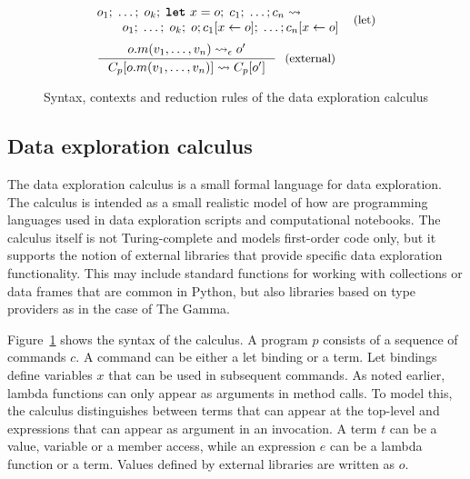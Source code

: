 \documentclass[fleqn,11pt]{report}
\newcommand{\kvd}[1]{\textnormal{\ttfamily\bfseries #1}}
\theoremstyle{definition}
\begin{document}
\begin{figure}
%
\hspace{0.5em}{\sffamily Let elimination and member reduction}
%
\begin{equation*}
\begin{array}{l}
\hspace{-0.5em}\begin{array}{l}
o_1;\; \ldots;\; o_{k};\; \kvd{let}~x=o;\; c_{1};\; \ldots; c_n \rightsquigarrow\\
\qquad  o_1;\; \ldots;\; o_{k};\; o; c_{1}[x\leftarrow o];\; \ldots; c_n[x\leftarrow o]\end{array}
~~\text{\small (let)}\\[1.2em]
\inference
  {o.m(v_1, \ldots, v_n) \rightsquigarrow_\epsilon o'}
  {C_p[o.m(v_1, \ldots, v_n)] \rightsquigarrow C_p[o']}
~~\text{\small (external)}
\end{array}
\end{equation*}

\caption{Syntax, contexts and reduction rules of the data exploration calculus}
\label{fig:dec-calculus}
\end{figure}

\subsection{Data exploration calculus}

The data exploration calculus is a small formal language for data exploration. The calculus is
intended as a small realistic model of how are programming languages used in data exploration scripts
and computational notebooks. The calculus itself is not Turing-complete and models first-order
code only, but it supports the notion of external libraries that provide specific data exploration
functionality. This may include standard functions for working with collections or data frames that
are common in Python, but also libraries based on type providers as in the case of The Gamma.

Figure~\ref{fig:dec-calculus} shows the syntax of the calculus.
A program $p$ consists of a sequence of commands $c$.
A command can be either a let binding or a term. Let bindings define variables $x$
that can be used in subsequent commands. As noted earlier, lambda functions can only appear as
arguments in method calls. To model this, the calculus distinguishes between terms that can appear
at the top-level and expressions that can appear as argument in an invocation.
A term $t$ can be a value, variable or a member access, while an expression $e$
can be a lambda function or a term. Values defined by external libraries are written
as $o$.
\end{document}
